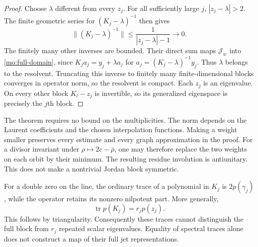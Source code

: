 \begin{proof}
Choose $\lambda$ different from every $z_j$. For all sufficiently
large $j$, $|z_j-\lambda|>2$. The finite geometric series for
$(K_j-\lambda)^{-1}$ then gives
\[
 \|(K_j-\lambda)^{-1}\|
 \leq\frac1{|z_j-\lambda|-1}\longrightarrow0.
\]
The finitely many other inverses are bounded. Their direct sum
maps $\mathscr J_w$ into \eqref{mo:full-domain}, since
$K_ja_j=y_j+\lambda a_j$ for
$a_j=(K_j-\lambda)^{-1}y_j$.
Thus $\lambda$ belongs to the resolvent. Truncating this inverse
to finitely many finite-dimensional blocks converges in operator
norm, so the resolvent is compact. Each $z_j$ is an eigenvalue.
On every other block $K_l-z_j$ is invertible, so its generalized
eigenspace is precisely the $j$th block.
\end{proof}

The theorem requires no bound on the multiplicities. The norm
depends on the Laurent coefficients and the chosen interpolation
functions. Making a weight smaller preserves every estimate and
every graph approximation in the proof. For a divisor invariant
under $\rho\mapsto2c-\overline\rho$, one may therefore replace
the two weights on each orbit by their minimum. The resulting
residue involution is antiunitary. This does not make a nontrivial
Jordan block symmetric.

For a double zero on the line, the ordinary trace of a polynomial
in $K_j$ is $2p(\gamma_j)$, while the operator retains its
nonzero nilpotent part. More generally,
\[
 \operatorname{tr}p(K_j)=r_jp(z_j).
\]
This follows by triangularity. Consequently these traces cannot
distinguish the full block from $r_j$ repeated scalar eigenvalues.
Equality of spectral traces alone does not construct a map of
their full jet representations.
